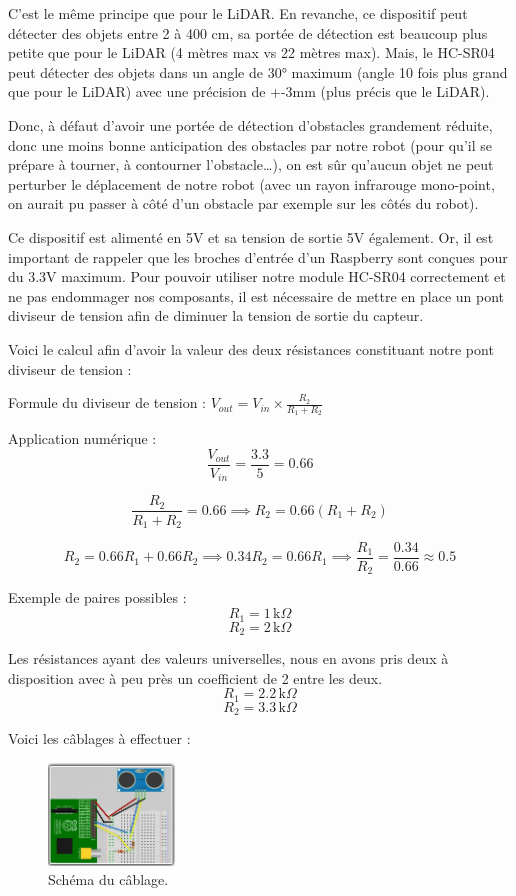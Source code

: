 \documentclass[a4paper,12pt]{report}  %
\begin{document}
C’est le même principe que pour le LiDAR. 
En revanche, ce dispositif peut détecter des objets entre 2 à 400 cm, sa portée de détection est beaucoup plus petite que pour le LiDAR (4 mètres max vs 22 mètres max). Mais, le HC-SR04 peut détecter des objets dans un angle de 30° maximum (angle 10 fois plus grand que pour le LiDAR) avec une précision de +-3mm (plus précis que le LiDAR).

Donc, à défaut d’avoir une portée de détection d’obstacles grandement réduite, donc une moins bonne anticipation des obstacles par notre robot (pour qu’il se prépare à tourner, à contourner l’obstacle…), on est sûr qu’aucun objet ne peut perturber le déplacement de notre robot (avec un rayon infrarouge mono-point, on aurait pu passer à côté d’un obstacle par exemple sur les côtés du robot).

Ce dispositif est alimenté en 5V et sa tension de sortie 5V également. Or, il est important de rappeler que les broches d’entrée d’un Raspberry sont conçues pour du 3.3V maximum. Pour pouvoir utiliser notre module HC-SR04 correctement et ne pas endommager nos composants, il est nécessaire de mettre en place un pont diviseur de tension afin de diminuer la tension de sortie du capteur.


Voici le calcul afin d’avoir la valeur des deux résistances constituant notre pont diviseur de tension : 

Formule du diviseur de tension : $V_{out} = V_{in} \times \frac{R_2}{R_1 + R_2}$

Application numérique : $$\frac{V_{out}}{V_{in}} = \frac{3.3}{5} = 0.66$$

$$\frac{R_2}{R_1 + R_2} = 0.66 \implies R_2 = 0.66 (R_1 + R_2)$$

$$R_2 = 0.66 R_1 + 0.66 R_2 \implies 0.34 R_2 = 0.66 R_1 \implies \frac{R_1}{R_2} = \frac{0.34}{0.66} \approx 0.5$$


Exemple de paires possibles : 
$$R_1 = 1 \, \mathrm{k}\Omega$$
$$R_2 = 2 \, \mathrm{k}\Omega$$

Les résistances ayant des valeurs universelles, 
nous en avons pris deux à disposition avec à peu près un coefficient de 2 entre les deux.
$$R_1 = 2.2 \, \mathrm{k}\Omega$$
$$R_2 = 3.3 \, \mathrm{k}\Omega$$

Voici les câblages à effectuer :

\begin{figure}[H]
	\centering
	\includegraphics[width=0.3\textwidth]{./attachments/capteur_ultrason_rpi.jpg}
	\caption{Schéma du câblage.}
	
\end{figure}
\end{document}
